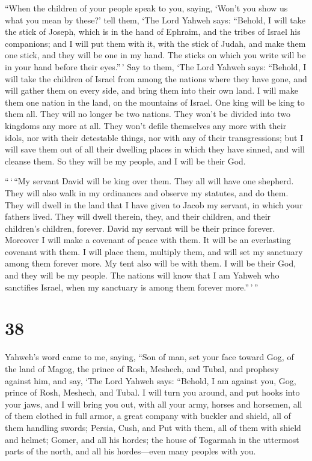 ``When the children of your people speak to you, saying,
`Won't you show us what you mean by these?'  tell them,
`The Lord Yahweh says: ``Behold, I will take the stick of Joseph, which
is in the hand of Ephraim, and the tribes of Israel his companions; and
I will put them with it, with the stick of Judah, and make them one
stick, and they will be one in my hand.  The sticks on
which you write will be in your hand before their eyes.''\,'
 Say to them, `The Lord Yahweh says: ``Behold, I will take
the children of Israel from among the nations where they have gone, and
will gather them on every side, and bring them into their own land.
 I will make them one nation in the land, on the mountains
of Israel. One king will be king to them all. They will no longer be two
nations. They won't be divided into two kingdoms any more at all.
 They won't defile themselves any more with their idols,
nor with their detestable things, nor with any of their transgressions;
but I will save them out of all their dwelling places in which they have
sinned, and will cleanse them. So they will be my people, and I will be
their God.

 ``\,`\,``My servant David will be king over them. They all
will have one shepherd. They will also walk in my ordinances and observe
my statutes, and do them.  They will dwell in the land that
I have given to Jacob my servant, in which your fathers lived. They will
dwell therein, they, and their children, and their children's children,
forever. David my servant will be their prince forever. 
Moreover I will make a covenant of peace with them. It will be an
everlasting covenant with them. I will place them, multiply them, and
will set my sanctuary among them forever more.  My tent
also will be with them. I will be their God, and they will be my people.
 The nations will know that I am Yahweh who sanctifies
Israel, when my sanctuary is among them forever more.''\,'\,''

\hypertarget{section-36}{%
\section{38}\label{section-36}}

 Yahweh's word came to me, saying,  ``Son of
man, set your face toward Gog, of the land of Magog, the prince of Rosh,
Meshech, and Tubal, and prophesy against him,  and say, `The
Lord Yahweh says: ``Behold, I am against you, Gog, prince of Rosh,
Meshech, and Tubal.  I will turn you around, and put hooks
into your jaws, and I will bring you out, with all your army, horses and
horsemen, all of them clothed in full armor, a great company with
buckler and shield, all of them handling swords;  Persia,
Cush, and Put with them, all of them with shield and helmet;
 Gomer, and all his hordes; the house of Togarmah in the
uttermost parts of the north, and all his hordes---even many peoples
with you.

